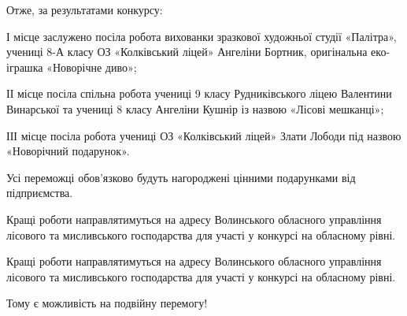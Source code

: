 
Отже, за результатами конкурсу:

І місце заслужено посіла робота вихованки зразкової художньої студії «Палітра»,
учениці 8-А класу ОЗ «Колківський ліцей» Ангеліни Бортник, оригінальна
еко-іграшка «Новорічне диво»;

ІІ місце посіла спільна робота учениці 9 класу Рудниківського ліцею Валентини
Винарської та учениці 8 класу Ангеліни Кушнір із назвою «Лісові мешканці»;

ІІІ місце посіла робота учениці ОЗ «Колківський ліцей» Злати Лободи під назвою
«Новорічний подарунок».

Усі переможці обов’язково будуть нагороджені цінними подарунками від
підприємства.


\begin{zznagolos}
Кращі роботи направлятимуться на адресу Волинського обласного управління
лісового та мисливського господарства для участі у конкурсі на обласному рівні.	
\end{zznagolos}

Кращі роботи направлятимуться на адресу Волинського обласного управління
лісового та мисливського господарства для участі у конкурсі на обласному рівні.

Тому є можливість на подвійну перемогу!

